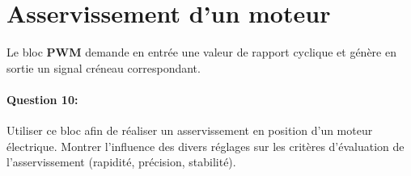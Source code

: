 \section{Asservissement d'un moteur}

Le bloc \textbf{PWM} demande en entrée une valeur de rapport cyclique et génère en sortie un signal créneau correspondant.

\paragraph{Question 10:} Utiliser ce bloc afin de réaliser un asservissement en position d'un moteur électrique. Montrer l'influence des divers réglages sur les critères d'évaluation de l'asservissement (rapidité, précision, stabilité).


